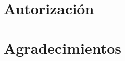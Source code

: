 \documentclass[12pt]{article}
\begin{document}


\section*{Autorización}

\section*{Agradecimientos}

\newpage

\setcounter{tocdepth}{4}
\setcounter{secnumdepth}{4}
\tableofcontents


\newpage

\listoffigures
\listoftables

\newpage












\newpage


 
\nocite{*}

\newpage

\printglossaries

\newpage


\end{document}
